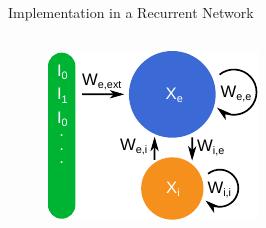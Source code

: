 \documentclass[8pt,aspectratio=169]{beamer}
\begin{document}
\begin{frame}{Implementation in a Recurrent Network}
\begin{columns}[T]
\begin{column}{0.5\textwidth}
\begin{figure}
\includegraphics{./figures/rec_ei_network_illustration.pdf}
\end{figure}
\end{column}
\begin{column}{0.5\textwidth}

\end{column}
\end{columns}
\end{frame}
\end{document}
